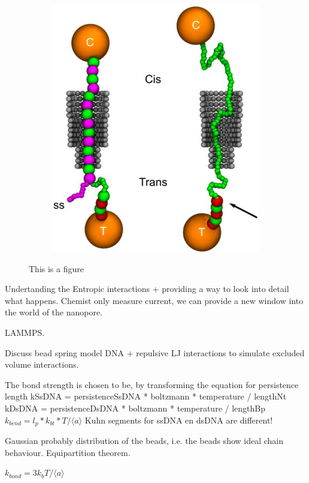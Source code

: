 \begin{figure}[ht]
\begin{centering}
\begin{subfigure}[t]{\dimexpr.5\linewidth-1.3em\relax}
  \includegraphics[width=0.9\linewidth,valign=t]{Figures/Stefanos2.png}
  \end{subfigure}
  \caption{This is a figure}
  \label{fig:test}
  \end{centering}
\end{figure}

Undertanding the Entropic interactions + providing a way to look into detail what
happens. Chemist only measure current, we can provide a new window into the world of the
nanopore.

LAMMPS.

Discuss bead spring model DNA + repulsive LJ interactions to simulate excluded volume
interactions.

The bond strength is chosen to be, by transforming the equation for persistence length
kSsDNA = persistenceSsDNA * boltzmann * temperature / lengthNt
kDsDNA = persistenceDsDNA * boltzmann * temperature / lengthBp
$k_{bend} = l_p * k_{bt} * T / \langle a \rangle$
Kuhn segments for ssDNA en dsDNA are different!

Gaussian probably distribution of the beads, i.e. the beads show ideal chain behaviour.
Equipartition theorem.

$k_{bond} = 3 k_b T / \langle a \rangle$

